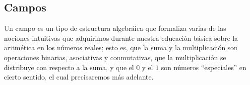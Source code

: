 \documentclass[apuntes]{subfiles}
\begin{document}

    
%

\newpage
\subsection*{Campos} \label{Ssec: Campos}

Un campo es un tipo de estructura algebráica que formaliza varias de las nociones intuitivas que adquirimos durante nuestra educación básica sobre la aritmética en los números reales; esto es, que la suma y la multiplicación son operaciones binarias, asociativas y conmutativas, que la multiplicación se distribuye con respecto a la suma, y que el $0$ y el $1$ son números ``especiales'' en cierto sentido, el cual precisaremos más adelante. \\
\end{document}
